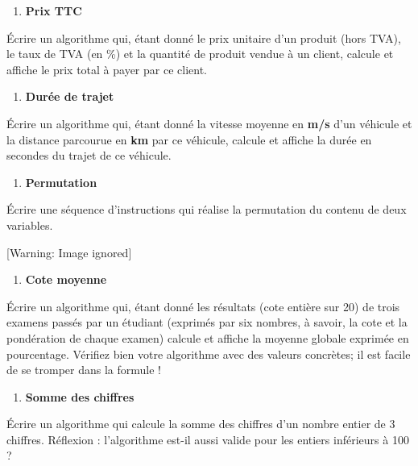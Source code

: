 \liststyleExercice
\setcounter{saveenum}{\value{enumi}}
\begin{enumerate}
\setcounter{enumi}{\value{saveenum}}
\item {\sffamily\bfseries
Prix TTC}
\end{enumerate}
{
Écrire un algorithme qui, étant donné le prix unitaire d’un produit
(hors TVA), le taux de TVA (en \%) et la quantité de produit vendue à
un client, calcule et affiche le prix total à payer par ce client.}

\liststyleExercice
\setcounter{saveenum}{\value{enumi}}
\begin{enumerate}
\setcounter{enumi}{\value{saveenum}}
\item {\sffamily\bfseries
Durée de trajet}
\end{enumerate}
{
Écrire un algorithme qui, étant donné la vitesse moyenne en \textbf{m/s}
d’un véhicule et la distance parcourue en \textbf{km} par ce véhicule,
calcule et affiche la durée en secondes du trajet de ce véhicule.}

\liststyleExercice
\setcounter{saveenum}{\value{enumi}}
\begin{enumerate}
\setcounter{enumi}{\value{saveenum}}
\item {\sffamily\bfseries
Permutation}
\end{enumerate}
{
Écrire une séquence d’instructions qui réalise la permutation du contenu
de deux variables.}

\begin{center}
 [Warning: Image ignored] %

\end{center}
\liststyleExercice
\setcounter{saveenum}{\value{enumi}}
\begin{enumerate}
\setcounter{enumi}{\value{saveenum}}
\item {\sffamily\bfseries
Cote moyenne}
\end{enumerate}
{
Écrire un algorithme qui, étant donné les résultats (cote entière sur
20) de trois examens passés par un étudiant (exprimés par six nombres,
à savoir, la cote et la pondération de chaque examen) calcule et
affiche la moyenne globale exprimée en pourcentage. Vérifiez bien votre
algorithme avec des valeurs concrètes; il est facile de se tromper dans
la formule !}

\liststyleExercice
\setcounter{saveenum}{\value{enumi}}
\begin{enumerate}
\setcounter{enumi}{\value{saveenum}}
\item {\sffamily\bfseries
Somme des chiffres}
\end{enumerate}
{
Écrire un algorithme qui calcule la somme des chiffres
d'un nombre entier de 3 chiffres.
Réflexion : l’algorithme est-il aussi valide pour les entiers inférieurs
à 100 ? }

